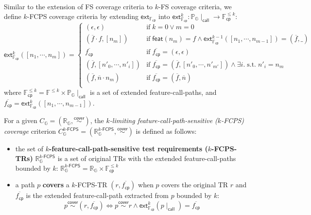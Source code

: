 \documentclass[acmsmall,review,screen]{acmart}
\newcommand{\tif}{\text{if} \; }
\newcommand{\tst}{{\; \text{s.t.} \; }}
\newcommand{\name}[1]{\textsf{#1}}
\newcommand{\graph}{\mathbb{G}}
\newcommand{\node}{n}
\newcommand{\nodes}{\overline{\node}}
\newcommand{\patset}[1]{\mathbb{P}_{#1}}
\newcommand{\pat}{p}
\newcommand{\cover}{\overset{\name{cover}}{\sim}}
\newcommand{\trset}[1]{\mathbb{R}_{#1}}
\newcommand{\tr}{r}
\newcommand{\cov}[1]{C_{#1}}
\newcommand{\featset}{\mathbb{F}}
\newcommand{\feat}{f}
\newcommand{\feats}{\overline{\feat}}
\newcommand{\featmap}{\name{feat}}
\newcommand{\css}[1]{{#1}\!\mid_{\name{call}}}
\newcommand{\fcpset}{\featset_\name{cp}}
\newcommand{\fcp}{\feat_\name{cp}}
\newcommand{\fcps}{\overline{\fcp}}
\newcommand{\extfcp}{\name{ext}_{\fcpset}}
\newcommand{\extfcps}[1]{\extfcp^{#1}}
\newcommand{\kfcpcov}[2]{\cov{#2}^{{#1}\name{-FCPS}}}
\newcommand{\kfcptrset}[2]{\trset{#2}^{{#1}\name{-FCPS}}}
\begin{document}
Similar to the extension of FS coverage criteria to $k$-FS coverage criteria,
we define $k$-FCPS coverage criteria by extending $\extfcp$ into $\extfcps{k}:
\css{\patset{\graph}} \rightarrow \fcpset^{\leq k}$:
%
\begin{equation}\label{equ:extfcps}
  \extfcps{k}([\node_1, \cdots, \node_m]) = \left\{
    \begin{array}{ll}
      (\epsilon, \epsilon) & \tif k = 0 \vee m = 0\\

      (\feats \cdot \feat, [\node_m]) & \tif \featmap(\node_m) = \feat \wedge
      \extfcps{k-1}([\node_1, \cdots, \node_{m-1}]) = (\feats, \_)\\

      \fcps & \tif \fcps = (\epsilon, \epsilon)\\

      (\feats, [\node'_0, \cdots, \node'_i]) &
      \tif \fcps = (\feats, [\node'_0, \cdots, \node'_{m'}]) \wedge
      \exists i. \tst \node'_i = \node_m\\

      (\feats, \nodes \cdot \node_m) & \tif \fcps = (\feats, \nodes)\\
    \end{array}
  \right.
\end{equation}
%
where $\fcpset^{\leq k} = \featset^{\leq k} \times \css{\patset{\graph}}$ is a
set of extended feature-call-paths, and $\fcps = \extfcps{k}([\node_1, \cdots,
\node_{m-1}])$.


\begin{definition}\label{def:k-fcps-cov}
  For a given $\cov{\graph} = (\trset{\graph}, \cover)$, the
  \textit{$k$-limiting feature-call-path-sensitive ($k$-FCPS) coverage}
  criterion $\kfcpcov{k}{\graph} = (\kfcptrset{k}{\graph}, \cover)$ is defined
  as follows:
  \begin{itemize}
    \item the set of \textbf{$k$-feature-call-path-sensitive test requirements
      ($k$-FCPS-TRs)} $\kfcptrset{k}{\graph}$ is a set of original TRs with the
      extended feature-call-paths bounded by $k$:
$
        \kfcptrset{k}{\graph} = \trset{\graph} \times \fcpset^{\leq k}
$
    \item a path $\pat$ \textbf{covers} a $k$-FCPS-TR $(\tr, \fcps)$ when $\pat$
      covers the original TR $\tr$ and $\fcps$ is the extended feature-call-path
extracted from $\pat$ bounded by $k$:
\[
        \pat \cover (\tr, \fcps) \iff \pat \cover \tr \wedge
        \extfcps{k}(\css{\pat}) = \fcps
\]
  \end{itemize}
\end{definition}
\end{document}
